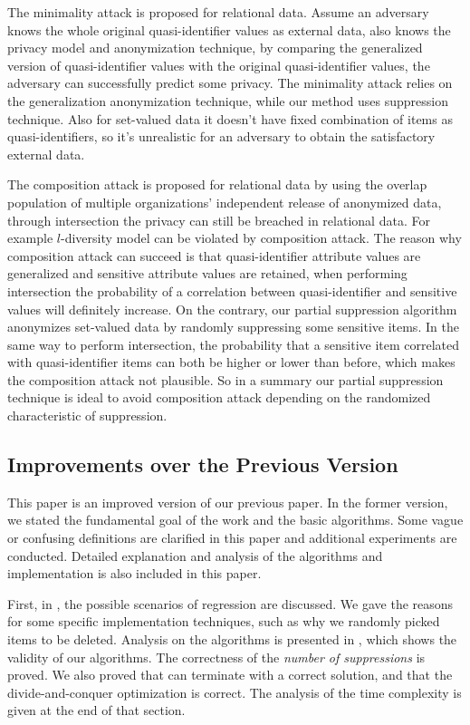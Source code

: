 The minimality attack \cite{Wong:2007:Minimality}
is proposed for relational data. Assume an adversary knows the whole original
quasi-identifier values as external data, also knows the privacy model and
anonymization technique, by comparing the generalized version of
quasi-identifier values with the original quasi-identifier values, the
adversary can successfully predict some privacy. The minimality attack relies
on the generalization anonymization technique, while our method uses
suppression technique. Also for set-valued data it doesn't have fixed
combination of items as quasi-identifiers, so it's unrealistic for an
adversary to obtain the satisfactory external data.

The composition attack
\cite{Ganta:2008:Composition} is proposed for relational data by using the
overlap population of multiple organizations' independent release of
anonymized data, through intersection the privacy can still be breached in
relational data. For example $l$-diversity \cite{Ganta:2008:Composition}
model can be violated by composition attack. The reason why composition
attack can succeed is that quasi-identifier attribute values are generalized
and sensitive attribute values are retained, when performing intersection the
probability of a correlation between quasi-identifier and sensitive values
will definitely increase. On the contrary, our partial suppression algorithm
anonymizes set-valued data by randomly suppressing some sensitive items. In
the same way to perform intersection,
 the probability that a sensitive item correlated with quasi-identifier items can
both be higher or lower than before, which makes the
composition attack not plausible. So in a summary our partial suppression technique is ideal to
avoid composition attack depending on the randomized characteristic of
suppression.

\subsection{Improvements over the Previous Version}
This paper is an improved version of our previous paper\cite{JiaPXZL14}.
In the former version, we stated the fundamental goal of the work and the basic algorithms.
Some vague or confusing definitions are clarified in this paper and
additional experiments are conducted.
Detailed explanation and analysis of the algorithms and implementation is also included in this paper.

First, in , the possible scenarios of regression are discussed.
We gave the reasons for some specific implementation techniques,
such as why we randomly picked items to be deleted.
Analysis on the algorithms is presented in ,
which shows the validity of our algorithms.
The correctness of the {\em number of suppressions} is proved.
We also proved that \PartialSuppressor can terminate with a correct solution,
and that the divide-and-conquer optimization is correct.
The analysis of the time complexity is given at the end of that section.

